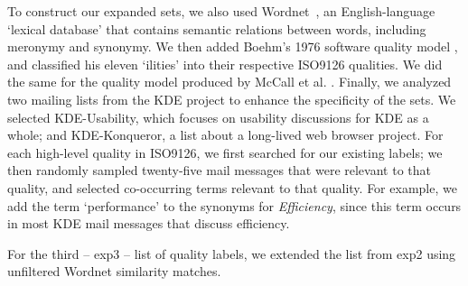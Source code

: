 \documentclass[10pt, conference, compsocconf]{IEEEtran}
\begin{document}
To construct our expanded sets, we also used Wordnet~\cite{Fellbaum1998}, an English-language ‘lexical database’ that contains semantic relations between words, including meronymy and synonymy. We then added Boehm’s 1976 software quality model \cite{Boehm+:1976:ICSE}, and classified his eleven ‘ilities’ into their respective ISO9126 qualities. We did the same for the quality model produced by McCall et al. \cite{mccall1977}. Finally, we analyzed two mailing lists from the KDE project to enhance the specificity of the sets. We selected KDE-Usability, which focuses on usability discussions for KDE as a whole; and KDE-Konqueror, a list about a long-lived web browser project. For each high-level quality in ISO9126, we first searched for our existing labels; we then randomly sampled twenty-five mail messages that were relevant to that quality, and selected co-occurring terms relevant to that quality. For example, we add the term ‘performance’ to the synonyms for \emph{Efficiency}, since this term occurs in most KDE mail messages that discuss efficiency.

For the third -- \textsf{exp3} -- list of quality labels, we extended the list from \textsf{exp2} using unfiltered Wordnet similarity matches. 
\end{document}

